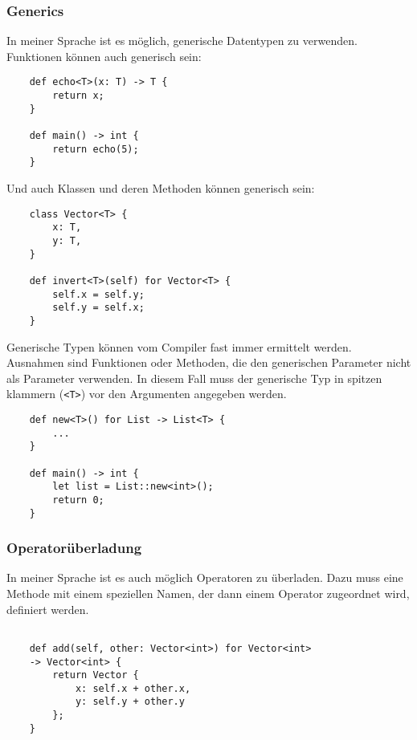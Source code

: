         \subsubsection{Generics}

        In meiner Sprache ist es möglich, generische Datentypen zu verwenden.
        Funktionen können auch generisch sein:
        \newpage
        \begin{lstlisting}
    def echo<T>(x: T) -> T {
        return x;
    }

    def main() -> int {
        return echo(5);
    }
        \end{lstlisting}


        Und auch Klassen und deren Methoden können generisch sein:

        \begin{lstlisting}
    class Vector<T> {
        x: T,
        y: T,
    }

    def invert<T>(self) for Vector<T> {
        self.x = self.y;
        self.y = self.x;
    }

        \end{lstlisting}

        Generische Typen können vom Compiler fast immer ermittelt werden.
        Ausnahmen sind Funktionen oder Methoden, die den generischen Parameter nicht
        als Parameter verwenden. In diesem Fall muss der generische Typ in spitzen klammern (\texttt{<T>}) 
        vor den Argumenten angegeben werden.
        
        \begin{lstlisting}
    def new<T>() for List -> List<T> {
        ...
    } 

    def main() -> int {
        let list = List::new<int>();
        return 0;
    }

        \end{lstlisting}


        \subsubsection{Operatorüberladung}
        In meiner Sprache ist es auch möglich Operatoren zu überladen. 
        Dazu muss eine Methode mit einem speziellen Namen, der dann einem Operator zugeordnet wird, definiert werden.

        \newpage
        \begin{lstlisting}

    def add(self, other: Vector<int>) for Vector<int> 
    -> Vector<int> {
        return Vector { 
            x: self.x + other.x, 
            y: self.y + other.y 
        };
    }

        \end{lstlisting}


